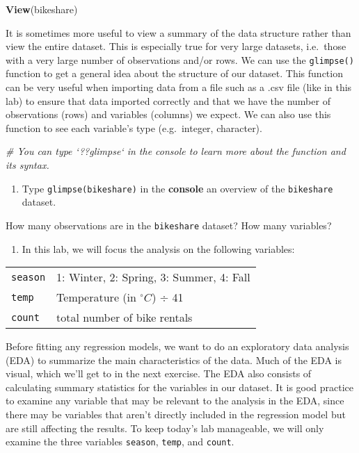 \documentclass[]{book}
\newenvironment{Shaded}{\begin{snugshade}}{\end{snugshade}}
\newcommand{\KeywordTok}[1]{\textcolor[rgb]{0.13,0.29,0.53}{\textbf{#1}}}
\newcommand{\CommentTok}[1]{\textcolor[rgb]{0.56,0.35,0.01}{\textit{#1}}}
\newcommand{\NormalTok}[1]{#1}
\providecommand{\tightlist}{%
  \setlength{\itemsep}{0pt}\setlength{\parskip}{0pt}}
\begin{document}
\begin{Shaded}
\begin{Highlighting}[]
\KeywordTok{View}\NormalTok{(bikeshare)}
\end{Highlighting}
\end{Shaded}

It is sometimes more useful to view a summary of the data structure
rather than view the entire dataset. This is especially true for very
large datasets, i.e.~those with a very large number of observations
and/or rows. We can use the \texttt{glimpse()} function to get a general
idea about the structure of our dataset. This function can be very
useful when importing data from a file such as a .csv file (like in this
lab) to ensure that data imported correctly and that we have the number
of observations (rows) and variables (columns) we expect. We can also
use this function to see each variable's type (e.g.~integer, character).

\begin{Shaded}
\begin{Highlighting}[]
\CommentTok{# You can  type `??glimpse` in the console to learn more about the function and its syntax.}
\end{Highlighting}
\end{Shaded}

\begin{enumerate}
\def\labelenumi{\arabic{enumi}.}
\tightlist
\item
  Type \texttt{glimpse(bikeshare)} in the \textbf{console} an overview
  of the \texttt{bikeshare} dataset.
\end{enumerate}

How many observations are in the \texttt{bikeshare} dataset? How many
variables?

\begin{enumerate}
\def\labelenumi{\arabic{enumi}.}
\setcounter{enumi}{1}
\tightlist
\item
  In this lab, we will focus the analysis on the following variables:
\end{enumerate}

\begin{longtable}[]{@{}ll@{}}
\toprule
\texttt{season} & 1: Winter, 2: Spring, 3: Summer, 4:
Fall\tabularnewline
\texttt{temp} & Temperature (in \(^{\circ}C\)) ÷ 41\tabularnewline
\texttt{count} & total number of bike rentals\tabularnewline
\bottomrule
\end{longtable}

Before fitting any regression models, we want to do an exploratory data
analysis (EDA) to summarize the main characteristics of the data. Much
of the EDA is visual, which we'll get to in the next exercise. The EDA
also consists of calculating summary statistics for the variables in our
dataset. It is good practice to examine any variable that may be
relevant to the analysis in the EDA, since there may be variables that
aren't directly included in the regression model but are still affecting
the results. To keep today's lab manageable, we will only examine the
three variables \texttt{season}, \texttt{temp}, and \texttt{count}.
\end{document}
